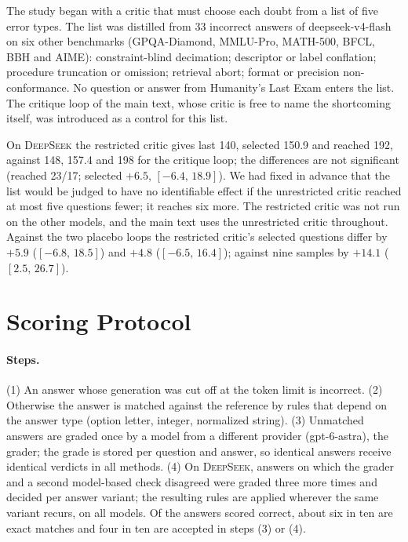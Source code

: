 \documentclass[11pt]{article}
\newcommand{\ds}{\textsc{DeepSeek}}
\newcommand{\ci}[2]{$[#1,\,#2]$}
\begin{document}
The study began with a critic that must choose each doubt from a list of five error types.
The list was distilled from 33 incorrect answers of deepseek-v4-flash on six other benchmarks (GPQA-Diamond, MMLU-Pro, MATH-500, BFCL, BBH and AIME): constraint-blind decimation; descriptor or label conflation; procedure truncation or omission; retrieval abort; format or precision non-conformance.
No question or answer from Humanity's Last Exam enters the list.
The critique loop of the main text, whose critic is free to name the shortcoming itself, was introduced as a control for this list.

On \ds{} the restricted critic gives last 140, selected 150.9 and reached 192, against 148, 157.4 and 198 for the critique loop; the differences are not significant (reached 23/17; selected $+6.5$, \ci{-6.4}{18.9}).
We had fixed in advance that the list would be judged to have no identifiable effect if the unrestricted critic reached at most five questions fewer; it reaches six more.
The restricted critic was not run on the other models, and the main text uses the unrestricted critic throughout.
Against the two placebo loops the restricted critic's selected questions differ by $+5.9$ (\ci{-6.8}{18.5}) and $+4.8$ (\ci{-6.5}{16.4}); against nine samples by $+14.1$ (\ci{2.5}{26.7}).

\section{Scoring Protocol}
\label{app:scoring}

\paragraph{Steps.}
(1) An answer whose generation was cut off at the token limit is incorrect.
(2) Otherwise the answer is matched against the reference by rules that depend on the answer type (option letter, integer, normalized string).
(3) Unmatched answers are graded once by a model from a different provider (gpt-6-astra), the grader; the grade is stored per question and answer, so identical answers receive identical verdicts in all methods.
(4) On \ds, answers on which the grader and a second model-based check disagreed were graded three more times and decided per answer variant; the resulting rules are applied wherever the same variant recurs, on all models.
Of the answers scored correct, about six in ten are exact matches and four in ten are accepted in steps (3) or (4).
\end{document}
